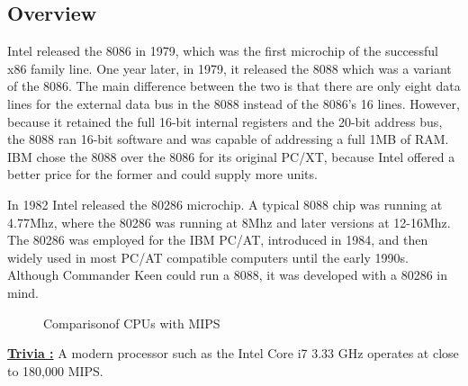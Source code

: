 \documentclass[book.tex]{subfiles}
\begin{document}
\subsection{Overview}
  Intel released the 8086 in 1979, which was the first microchip of the successful x86 family line. One year later, in 1979, it released the 8088 which was a variant of the 8086. The main difference between the two is that there are only eight data lines for the external data bus in the 8088 instead of the 8086's 16 lines.  However, because it retained the full 16-bit internal registers and the 20-bit address bus, the 8088 ran 16-bit software and was capable of addressing a full 1MB of RAM. IBM chose the 8088 over the 8086 for its original PC/XT, because Intel offered a better price for the former and could supply more units. \\
  \par
  In 1982 Intel released the 80286 microchip. A typical 8088 chip was running at 4.77Mhz, where the 80286 was running at 8Mhz and later versions at 12-16Mhz. The 80286 was employed for the IBM PC/AT, introduced in 1984, and then widely used in most PC/AT compatible computers until the early 1990s. Although Commander Keen could run a 8088, it was developed with a 80286 in mind.\\   

\par


\begin{figure}[H]
\centering
   \caption{Comparison\protect\footnotemark of CPUs with MIPS}
 \end{figure}
 \par
 \par
  \textbf{\underline{Trivia :}} A modern processor such as the Intel Core i7 3.33 GHz operates at close to 180,000 MIPS.\\
  \par
\end{document}
